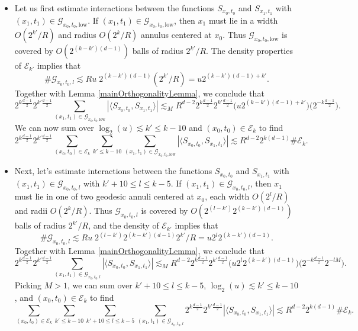 \documentclass[dvipsnames,letterpaper,12pt]{article}
\begin{document}
\begin{itemize}
    \item Let us first estimate interactions between the functions ${S\!}_{x_0,t_0}$ and ${S\!}_{x_1,t_1}$ with $(x_1,t_1) \in \mathcal{G}_{x_0,t_0,\text{low}}$. If $(x_1,t_1) \in \mathcal{G}_{x_0,t_0,\text{low}}$, then $x_1$ must lie in a width $O(2^{k'} / R)$ and radius $O(2^k / R)$ annulus centered at $x_0$. Thus $\mathcal{G}_{x_0,t_0,\text{low}}$ is covered by $O( 2^{(k-k')(d-1)} )$ balls of radius $2^{k'} / R$. The density properties of $\mathcal{E}_{k'}$ implies that
    \[ \# \mathcal{G}_{x_0,t_0,l} \lesssim Ru\; 2^{(k-k')(d-1)} (2^{k'} / R) = u 2^{(k-k')(d-1) + k'}. \]
    Together with Lemma \ref{mainOrthogonalityLemma}, we conclude that
    \[ 2^{k \frac{d-1}{2}} 2^{k' \frac{d-1}{2}} \sum_{(x_1,t_1) \in \mathcal{G}_{x_0,t_0,\text{low}}} |\langle {S\!}_{x_0,t_0}, {S\!}_{x_1,t_1} \rangle| \lesssim_M R^{d-2} 2^{k \frac{d-1}{2}} 2^{k' \frac{d-1}{2}} \Big( u 2^{(k-k')(d-1) + k'} \Big) \Big( 2^{-k \frac{d-1}{2}} \Big). \]
    We can now sum over $\log_2(u) \lesssim k' \leq k - 10$ and $(x_0,t_0) \in \mathcal{E}_k$ to find
    \[ 2^{k \frac{d-1}{2}} 2^{k' \frac{d-1}{2}} \sum_{(x_0,t_0) \in \mathcal{E}_k} \sum_{k' \leq k - 10} \sum_{(x_1,t_1) \in \mathcal{G}_{x_0,t_0,\text{low}}} |\langle {S\!}_{x_0,t_0}, {S\!}_{x_1,t_1} \rangle| \lesssim R^{d-2} 2^{k (d-1)} \# \mathcal{E}_k. \]

    \item Next, let's estimate interactions between the functions ${S\!}_{x_0,t_0}$ and ${S\!}_{x_1,t_1}$ with $(x_1,t_1) \in \mathcal{G}_{x_0,t_0,l}$ with $k' + 10 \leq l \leq k - 5$. If $(x_1,t_1) \in \mathcal{G}_{x_0,t_0,l}$, then $x_1$ must lie in one of two geodesic annuli centered at $x_0$, each width $O(2^l/R)$ and radii $O(2^k / R)$. Thus $\mathcal{G}_{x_0,t_0,l}$ is covered by $O( 2^{(l-k')} 2^{(k-k')(d-1)} )$ balls of radius $2^{k'} / R$, and the density of $\mathcal{E}_{k'}$ implies that
    \[ \# \mathcal{G}_{x_0,t_0,l} \lesssim Ru\; 2^{(l-k')} 2^{(k-k')(d-1)} 2^{k'} / R = u 2^{l} 2^{(k-k')(d-1)}. \]
    Together with Lemma \ref{mainOrthogonalityLemma}, we conclude that
    \[ 2^{k \frac{d-1}{2}} 2^{k' \frac{d-1}{2}} \sum_{(x_1,t_1) \in \mathcal{G}_{x_0,t_0,l}} |\langle {S\!}_{x_0,t_0}, {S\!}_{x_1,t_1} \rangle| \lesssim_M R^{d-2} 2^{k \frac{d-1}{2}} 2^{k' \frac{d-1}{2}} \Big( u 2^{l} 2^{(k-k')(d-1)} \Big) \Big( 2^{-k \frac{d-1}{2}} 2^{-lM} \Big). \]
    Picking $M > 1$, we can sum over $k' + 10 \leq l \leq k - 5$, $\log_2(u) \lesssim k' \leq k - 10$, and $(x_0,t_0) \in \mathcal{E}_k$ to find
    \[ \sum_{(x_0,t_0) \in \mathcal{E}_k} \sum_{k' \leq k - 10} \sum_{k'+10 \leq l \leq k - 5} \sum_{(x_1,t_1) \in \mathcal{G}_{x_0,t_0,l}} 2^{k \frac{d-1}{2}} 2^{k' \frac{d-1}{2}} |\langle {S\!}_{x_0,t_0}, {S\!}_{x_1,t_1} \rangle| \lesssim R^{d-2} 2^{k (d-1)} \# \mathcal{E}_k. \]


\end{itemize}
\end{document}
